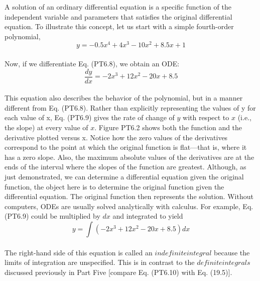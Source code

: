 \documentclass[../main.tex]{subfiles}
\begin{document}
A solution of an ordinary differential equation is a specific function of the independent
variable and parameters that satisfies the original differential equation. To illustrate this
concept, let us start with a simple fourth-order polynomial,\\
\begin{equation}
\tag{PT6.8}
y=-0.5x^4 + 4x^3 - 10x^2 + 8.5x + 1
\end{equation}\\
Now, if we differentiate Eq. (PT6.8), we obtain an ODE:
\begin{equation}
\tag{PT6.9}
\dfrac{dy}{dx} = -2x^3 + 12x^2 - 20x + 8.5
\end{equation}\\
This equation also describes the behavior of the polynomial, but in a manner different from
Eq. (PT6.8). Rather than explicitly representing the values of y for each value of x,
Eq. (PT6.9) gives the rate of change of $y$ with respect to $x$ (i.e., the slope) at every value of
$x$. Figure PT6.2 shows both the function and the derivative plotted versus x. Notice how the
zero values of the derivatives correspond to the point at which the original function is
flat—that is, where it has a zero slope. Also, the maximum absolute values of the derivatives are at the ends of the interval where the slopes of the function are greatest.
Although, as just demonstrated, we can determine a differential equation given the
original function, the object here is to determine the original function given the differential
equation. The original function then represents the solution. 
Without computers, ODEs are usually solved analytically with calculus. For example,
Eq. (PT6.9) could be multiplied by $dx$ and integrated to yield\\
\begin{equation}
\tag{PT6.10}
y= \int(-2x^3 + 12x^2 - 20x + 8.5)dx
\end{equation}\\
The right-hand side of this equation is called an $indefinite integral$ because the limits of integration are unspecified. This is in contrast to the $definite integrals$ discussed previously
in Part Five [compare Eq. (PT6.10) with Eq. (19.5)].
\end{document}
